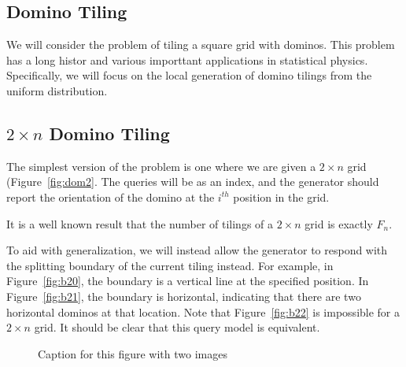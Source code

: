 \subsection{Domino Tiling}
We will consider the problem of tiling a square grid with dominos.
This problem has a long histor and various importtant applications in statistical physics.
Specifically, we will focus on the local generation of domino tilings from the uniform distribution.

\subsection{$2\times n$ Domino Tiling}
The simplest version of the problem is one where we are given a $2\times n$ grid (Figure~\ref{fig:dom2}.
The queries will be as an index, and the generator should report the orientation of the domino at the $i^{th}$ position in the grid.

It is a well known result  that the number of tilings of a $2\times n$ grid is exactly $F_n$.

To aid with generalization, we will instead allow the generator to respond with the splitting boundary of the current tiling instead.
For example, in Figure~\ref{fig:b20}, the boundary is a vertical line at the specified position.
In Figure~\ref{fig:b21}, the boundary is horizontal, indicating that there are two horizontal dominos at that location.
Note that Figure~\ref{fig:b22} is impossible for a $2\times n$ grid.
It should be clear that this query model is equivalent.

\begin{figure}[h]
    \centering

    \caption{Caption for this figure with two images}
    \label{fig:boundary2}
\end{figure}


